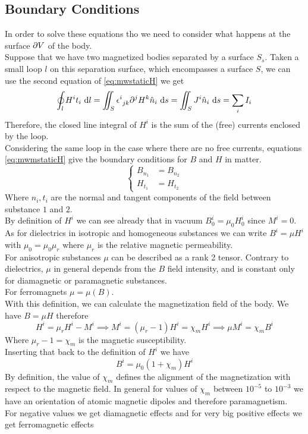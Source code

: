 \documentclass[../electromagnetism.tex]{subfiles}
\begin{document}
\subsection{Boundary Conditions}
In order to solve these equations tho we need to consider what happens at the surface $\partial V$ of the body.\\
Suppose that we have two magnetized bodies separated by a surface $S_s$. Taken a small loop $l$ on this separation surface, which encompasses a surface $S$, we can use the second equation of \eqref{eq:mwstaticH} we get
\begin{equation}
	\oint_lH^it_i\ \mathrm{d} l=\iint_S\epsilon^{i}_{\ jk}\partial^jH^k\hat{n}_i\ \mathrm{d} s=\iint_SJ^i\hat{n}_i\ \mathrm{d} s=\sum_iI_i
	\label{eq:sumofcurrents}
\end{equation}
Therefore, the closed line integral of $H^i$ is the sum of the (free) currents enclosed by the loop.\\
Considering the same loop in the case where there are no free currents, equations \eqref{eq:mwmstaticH} give the boundary conditions for $B$ and $H$ in matter.\\
\begin{equation}
	\left\{ \begin{aligned}
			B_{n_1}&=B_{n_2}\\
			H_{t_1}&=H_{t_2}
	\end{aligned}\right.
	\label{eq:boundcbh}
\end{equation}
Where $n_i,t_i$ are the normal and tangent components of the field between substance $1$ and $2$.\\
By definition of $H^i$ we can see already that in vacuum $B_0^i=\mu_0H^i_0$ since $M^i=0$. As for dielectrics in isotropic and homogeneous substances we can write $B^i=\mu H^i$ with $\mu_0=\mu_0\mu_r$ where $\mu_r$ is the relative magnetic permeability.\\
For anisotropic substances $\mu$ can be described as a rank 2 tensor. Contrary to dielectrics, $\mu$ in general depends from the $B$ field intensity, and is constant only for diamagnetic or paramagnetic substances.\\
For ferromagnets $\mu=\mu(B)$.\\
With this definition, we can calculate the magnetization field of the body. We have $B=\mu H$ therefore
\begin{equation}
	H^i=\mu_rH^i-M^i\implies M^i=(\mu_r-1)H^i=\chi_mH^i\implies\mu M^i=\chi_mB^i
	\label{eq:magneticsus}
\end{equation}
Where $\mu_r-1=\chi_m$ is the magnetic susceptibility.\\
Inserting that back to the definition of $H^i$ we have
\begin{equation}
	B^i=\mu_0\left( 1+\chi_m \right)H^i
	\label{eq:magsusbh}
\end{equation}
By definition, the value of $\chi_m$ defines the alignment of the magnetization with respect to the magnetic field. In general for values of $\chi_m$ between $10^{-5}$ to $10^{-3}$ we have an orientation of atomic magnetic dipoles and therefore paramagnetism.\\
For negative values we get diamagnetic effects and for very big positive effects we get ferromagnetic effects
\end{document}
